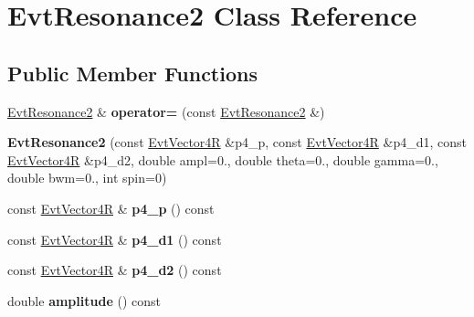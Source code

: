 \hypertarget{class_evt_resonance2}{}\section{Evt\+Resonance2 Class Reference}
\label{class_evt_resonance2}
\subsection*{Public Member Functions}
\begin{DoxyCompactItemize}
\item 
\hypertarget{class_evt_resonance2_a336a6688e58f6858a23ed54274be2712}{}\hyperlink{class_evt_resonance2}{Evt\+Resonance2} \& {\bfseries operator=} (const \hyperlink{class_evt_resonance2}{Evt\+Resonance2} \&)\label{class_evt_resonance2_a336a6688e58f6858a23ed54274be2712}

\item 
\hypertarget{class_evt_resonance2_a596210f0be10254319d98e1f33b241f8}{}{\bfseries Evt\+Resonance2} (const \hyperlink{class_evt_vector4_r}{Evt\+Vector4\+R} \&p4\+\_\+p, const \hyperlink{class_evt_vector4_r}{Evt\+Vector4\+R} \&p4\+\_\+d1, const \hyperlink{class_evt_vector4_r}{Evt\+Vector4\+R} \&p4\+\_\+d2, double ampl=0., double theta=0., double gamma=0., double bwm=0., int spin=0)\label{class_evt_resonance2_a596210f0be10254319d98e1f33b241f8}

\item 
\hypertarget{class_evt_resonance2_a57c5f3411d7e26c3a134bcac13a71049}{}const \hyperlink{class_evt_vector4_r}{Evt\+Vector4\+R} \& {\bfseries p4\+\_\+p} () const \label{class_evt_resonance2_a57c5f3411d7e26c3a134bcac13a71049}

\item 
\hypertarget{class_evt_resonance2_ab01c830a01ed23ca367f9da7a601146a}{}const \hyperlink{class_evt_vector4_r}{Evt\+Vector4\+R} \& {\bfseries p4\+\_\+d1} () const \label{class_evt_resonance2_ab01c830a01ed23ca367f9da7a601146a}

\item 
\hypertarget{class_evt_resonance2_a4b43b27bd13656f79f1e8c2c0e705d1f}{}const \hyperlink{class_evt_vector4_r}{Evt\+Vector4\+R} \& {\bfseries p4\+\_\+d2} () const \label{class_evt_resonance2_a4b43b27bd13656f79f1e8c2c0e705d1f}

\item 
\hypertarget{class_evt_resonance2_ad08d9a0873b53e41459c086b2e2ae40c}{}double {\bfseries amplitude} () const \label{class_evt_resonance2_ad08d9a0873b53e41459c086b2e2ae40c}


\end{DoxyCompactItemize}
